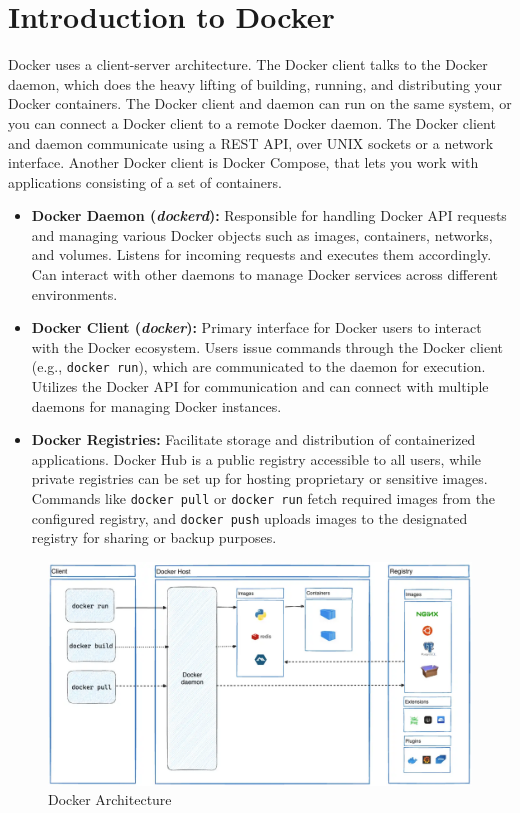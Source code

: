 \section{Introduction to Docker}
Docker uses a client-server architecture. The Docker client talks to the Docker daemon, which does the heavy lifting of building, running, and distributing your Docker containers. The Docker client and daemon can run on the same system, or you can connect a Docker client to a remote Docker daemon. The Docker client and daemon communicate using a REST API, over UNIX sockets or a network interface. Another Docker client is Docker Compose, that lets you work with applications consisting of a set of containers.
\newpage
\begin{itemize}
  \item \textbf{Docker Daemon (\textit{dockerd}):} Responsible for handling Docker API requests and managing various Docker objects such as images, containers, networks, and volumes. Listens for incoming requests and executes them accordingly. Can interact with other daemons to manage Docker services across different environments.
  
  \item \textbf{Docker Client (\textit{docker}):} Primary interface for Docker users to interact with the Docker ecosystem. Users issue commands through the Docker client (e.g., \texttt{docker run}), which are communicated to the daemon for execution. Utilizes the Docker API for communication and can connect with multiple daemons for managing Docker instances.
  
  \item \textbf{Docker Registries:} Facilitate storage and distribution of containerized applications. Docker Hub is a public registry accessible to all users, while private registries can be set up for hosting proprietary or sensitive images. Commands like \texttt{docker pull} or \texttt{docker run} fetch required images from the configured registry, and \texttt{docker push} uploads images to the designated registry for sharing or backup purposes.
\end{itemize}

\begin{figure}[h]
  \centering
  \includegraphics[width=\textwidth]{Figures/docker-architecture.png}
  \caption{Docker Architecture}
  \label{fig:container_architecture}
\end{figure}

